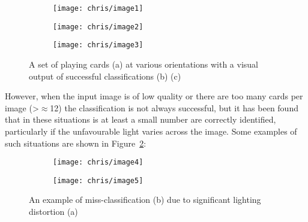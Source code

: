 		\begin{figure}[H]
			\centering
			\begin{subfigure}[b]{\textwidth}
				\centering
				\texttt{[image: chris/image1]}
				\caption{}
			\end{subfigure}
		\end{figure}
		\begin{figure}[H]
			\ContinuedFloat
			\centering
			\begin{subfigure}[b]{\textwidth}
				\centering
				\texttt{[image: chris/image2]}
				\caption{}
			\end{subfigure}
		\end{figure}
		\begin{figure}[H]
			\ContinuedFloat
			\centering
			\begin{subfigure}[b]{\textwidth}
				\centering
				\texttt{[image: chris/image3]}
				\caption{}
			\end{subfigure}
			\caption{A set of playing cards (a) at various orientations with a visual output of successful classifications (b) (c)}
			\label{fig:success}
		\end{figure}

		However, when the input image is of low quality or there are too many cards per image (\textgreater $\approx$12) the classification is not always successful, but it has been found that in these situations is at least a small number are correctly identified, particularly if the unfavourable light varies across the image. Some examples of such situations are shown in Figure~\ref{fig:fail}:

		\begin{figure}[H]
			\centering
			\begin{subfigure}[b]{\textwidth}
				\centering
				\texttt{[image: chris/image4]}
				\caption{}
			\end{subfigure}
		\end{figure}
		\begin{figure}[H]
			\ContinuedFloat
			\centering
			\begin{subfigure}[b]{\textwidth}
				\centering
				\texttt{[image: chris/image5]}
				\caption{}
			\end{subfigure}
			\caption{An example of miss-classification (b) due to significant lighting distortion (a)}
			\label{fig:fail}
		\end{figure}